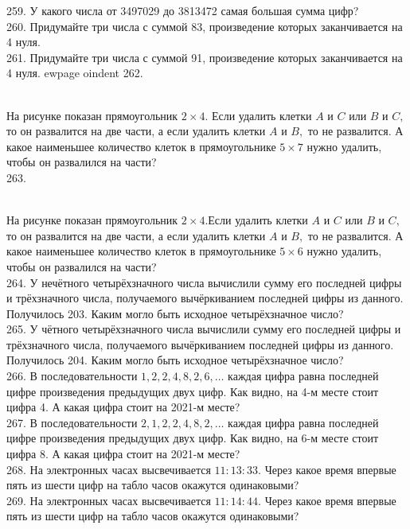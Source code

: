 259. У какого числа от 3497029 до 3813472 самая большая сумма цифр?\\
260. Придумайте три числа с суммой 83, произведение которых заканчивается на 4 нуля.\\
261. Придумайте три числа с суммой 91, произведение которых заканчивается на 4 нуля.
ewpage
oindent
262. \begin{figure}[ht!]
\end{figure}\\
На рисунке показан прямоугольник $2\times4.$ Если удалить клетки $A$ и $C$ или $B$ и $C,$ то он развалится на две части, а если удалить клетки $A$ и $B,$ то не развалится. А какое наименьшее количество клеток в прямоугольнике $5\times7$ нужно удалить, чтобы он развалился на части?\\
263. \begin{figure}[ht!]
\end{figure}\\
На рисунке показан прямоугольник $2\times4.$Если удалить клетки $A$ и $C$ или $B$ и $C,$ то он развалится на две части, а если удалить клетки $A$ и $B,$ то не развалится. А какое наименьшее количество клеток в прямоугольнике $5\times6$ нужно удалить, чтобы он развалился на части?\\
264. У нечётного четырёхзначного числа вычислили сумму его последней цифры и трёхзначного числа, получаемого вычёркиванием последней цифры из данного. Получилось 203. Каким могло быть исходное четырёхзначное число?\\
265. У чётного четырёхзначного числа вычислили сумму его последней цифры и трёхзначного числа, получаемого вычёркиванием последней цифры из данного. Получилось 204. Каким могло быть исходное четырёхзначное число?\\
266. В последовательности $1, 2, 2, 4, 8, 2, 6, \ldots$ каждая цифра равна последней цифре произведения предыдущих двух цифр. Как видно, на 4-м месте стоит цифра 4. А какая цифра стоит на 2021-м месте?\\
267. В последовательности $2, 1, 2, 2, 4, 8, 2, \ldots$ каждая цифра равна последней цифре произведения предыдущих двух цифр. Как видно, на 6-м месте стоит цифра 8. А какая цифра стоит на 2021-м месте?\\
268. На электронных часах высвечивается $11:13:33.$ Через какое время впервые пять из шести цифр на табло часов окажутся одинаковыми?\\
269. На электронных часах высвечивается $11:14:44.$ Через какое время впервые пять из шести цифр на табло часов окажутся одинаковыми?\\
